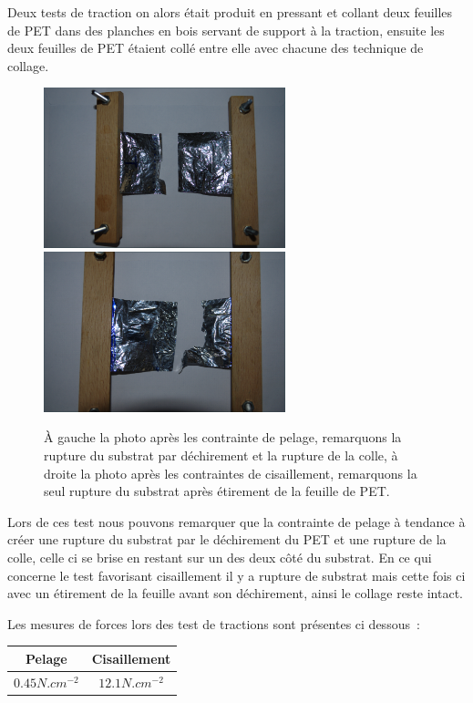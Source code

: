 \documentclass[a4paper,11pt]{article}
\begin{document}
Deux tests de traction on alors était produit en pressant et collant deux feuilles de PET dans des planches en bois servant de support à la traction, ensuite les deux feuilles de PET étaient collé entre elle avec chacune des technique de collage.

\begin{figure}[H]
	\centering
 \includegraphics[width=7cm]{../Images/test_pelage.png}
 \includegraphics[width=7cm]{../Images/test_cisaillement.png}
 \caption{À gauche la photo après les contrainte de pelage, remarquons la rupture du substrat par déchirement et la rupture de la colle, à droite la photo après les contraintes de cisaillement, remarquons la seul rupture du substrat après étirement de la feuille de PET.}
\end{figure}

Lors de ces test nous pouvons remarquer que la contrainte de pelage à tendance à créer une rupture du substrat par le déchirement du PET et une rupture de la colle, celle ci se brise en restant sur un des deux côté du substrat.
En ce qui concerne le test favorisant cisaillement il y a rupture de substrat mais cette fois ci avec un étirement de la feuille avant son déchirement, ainsi le collage reste intact.

Les mesures de forces lors des test de tractions sont présentes ci dessous~:

\begin{center}
  \begin{tabular}{|c|c|}
    \hline
    Pelage & Cisaillement \\
    \hline
    $0.45 N.cm^{-2}$ & $12.1 N.cm^{-2}$ \\
    \hline
  \end{tabular}
\end{center}
\end{document}
